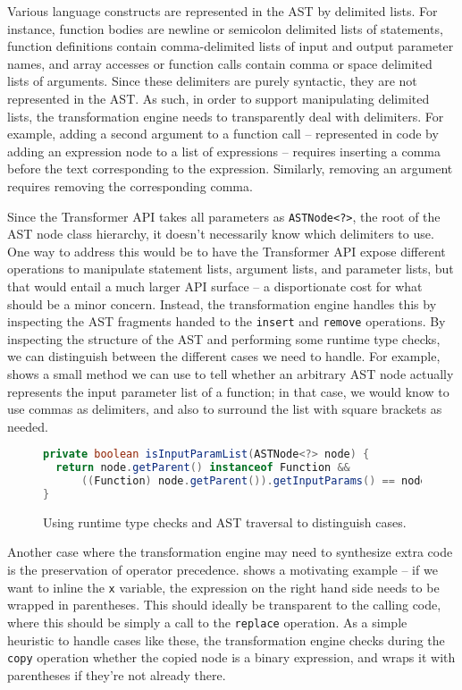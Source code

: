 Various \matlab language constructs are represented in the AST by delimited
lists. For instance, function bodies are newline or semicolon delimited lists
of statements, function definitions contain comma-delimited lists of input and
output parameter names, and array accesses or function calls contain comma or
space delimited lists of arguments. Since these delimiters are purely
syntactic, they are not represented in the AST. As such, in order to support
manipulating delimited lists, the transformation engine needs to transparently
deal with delimiters. For example, adding a second argument to a function call
-- represented in code by adding an expression node to a list of expressions --
requires inserting a comma before the text corresponding to the expression.
Similarly, removing an argument requires removing the corresponding comma.

Since the Transformer API takes all parameters as \texttt{ASTNode<?>}, the root
of the AST node class hierarchy, it doesn't necessarily know which delimiters
to use. One way to address this would be to have the Transformer API expose
different operations to manipulate statement lists, argument lists, and
parameter lists, but that would entail a much larger API surface -- a
disportionate cost for what should be a minor concern. Instead, the
transformation engine handles this by inspecting the AST fragments handed to
the \texttt{insert} and \texttt{remove} operations. By inspecting the structure
of the AST and performing some runtime type checks, we can distinguish between
the different cases we need to handle. For example, 
shows a small method we can use to tell whether an arbitrary AST node actually
represents the input parameter list of a function; in that case, we would know
to use commas as delimiters, and also to surround the list with square brackets
as needed.

\begin{figure}
\begin{lstlisting}[language=Java, numbers=none]
private boolean isInputParamList(ASTNode<?> node) {
  return node.getParent() instanceof Function &&
      ((Function) node.getParent()).getInputParams() == node;
}
\end{lstlisting}
\caption{Using runtime type checks and AST traversal to distinguish cases.}
\label{Fig:WhereAreWe}
\end{figure}

Another case where the transformation engine may need to synthesize extra code
is the preservation of operator precedence.  shows
a motivating example -- if we want to inline the \texttt{x} variable, the
expression on the right hand side needs to be wrapped in parentheses. This
should ideally be transparent to the calling code, where this should be simply
a call to the \texttt{replace} operation. As a simple heuristic to handle cases
like these, the transformation engine checks during the \texttt{copy} operation
whether the copied node is a binary expression, and wraps it with parentheses
if they're not already there.

